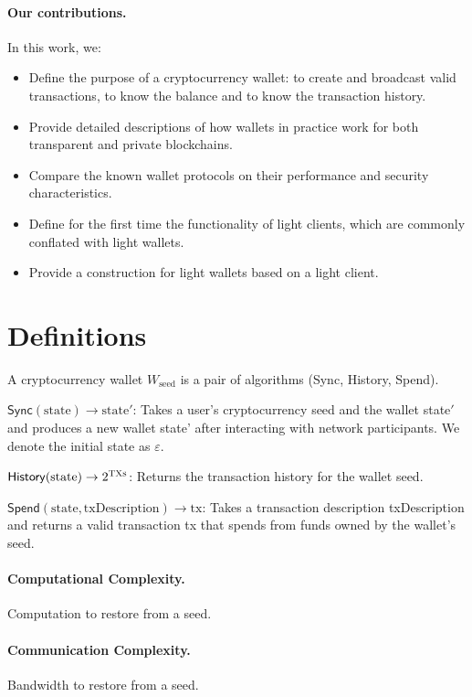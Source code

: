 \documentclass[sigconf]{acmart}
\begin{document}
\paragraph{Our contributions.} In this work, we:
\begin{itemize}
    \item Define the purpose of a cryptocurrency wallet: to create and broadcast valid transactions, to know the balance and to know the transaction history.
    \item Provide detailed descriptions of how wallets in practice work for both transparent and private blockchains.
    \item Compare the known wallet protocols on their performance and security characteristics.
    \item Define for the first time the functionality of light clients, which are commonly conflated with light wallets.
    \item Provide a construction for light wallets based on a light client.
\end{itemize}

\section{Definitions}
\begin{definition}
    A cryptocurrency wallet $W_\text{seed}$ is a pair of algorithms (\textsf{Sync}, \textsf{History}, \textsf{Spend}).
    
    $\mathsf{Sync}(\text{state}) \rightarrow \text{state}'$: Takes a user's cryptocurrency seed and the wallet state$'$ and produces a new wallet state' after interacting with network participants. We denote the initial state as $\varepsilon$.
    
    $\mathsf{History}(\text{state}) \rightarrow 2^\textsc{TXs}$: Returns the transaction history for the wallet seed.
    
    $\mathsf{Spend}(\text{state}, \text{txDescription}) \rightarrow \text{tx}$: Takes a transaction description txDescription and returns a valid transaction tx that spends from funds owned by the wallet's seed.
\end{definition}

\paragraph{Computational Complexity.} Computation to restore from a seed.
\paragraph{Communication Complexity.} Bandwidth to restore from a seed.
\end{document}
